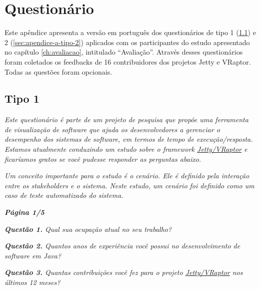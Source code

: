 \apendice
\chapter{Questionário} \label{ch:apendice-a}

Este apêndice apresenta a versão em português dos questionários de tipo 1 (\ref{sec:apendice-a-tipo-1}) e 2 (\ref{sec:apendice-a-tipo-2}) aplicados com os participantes do estudo apresentado no capítulo \ref{ch:avaliacao}, intitulado ``Avaliação''. Através desses questionários foram coletados os feedbacks de 16 contribuidores dos projetos Jetty e VRaptor. Todas as questões foram opcionais.

\section{Tipo 1} \label{sec:apendice-a-tipo-1}

\begin{framed}
  \noindent \textit{\textbf{\toolName}}
  \par
  \par
  \noindent \textit{Este questionário é parte de um projeto de pesquisa que propõe uma ferramenta de visualização de software que ajuda os desenvolvedores a gerenciar o desempenho dos sistemas de software, em termos de tempo de execução/resposta. Estamos atualmente conduzindo um estudo sobre o framework \underline{Jetty/VRaptor} e ficaríamos gratos se você pudesse responder as perguntas abaixo.}
  \par
  \noindent \textit{Um conceito importante para o estudo é o cenário. Ele é definido pela interação entre os stakeholders e o sistema. Neste estudo, um cenário foi definido como um caso de teste automatizado do sistema.}
\end{framed}
	
\begin{framed}
	\noindent \textit{\textbf{Página 1/5}}
	\par
	\noindent \textit{\textbf{Questão 1.} Qual sua ocupação atual no seu trabalho?}
	\par
	\noindent \textit{\textbf{Questão 2.} Quantos anos de experiência você possui no desenvolvimento de software em Java?}
	\par
	\noindent \textit{\textbf{Questão 3.} Quantas contribuições você fez para o projeto \underline{Jetty/VRaptor} nos últimos 12 meses?}
\end{framed}

